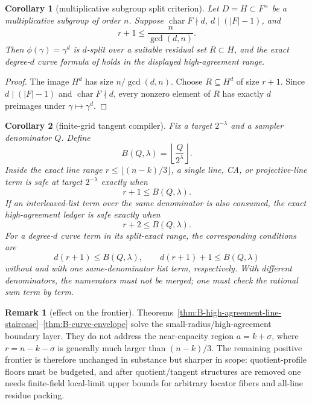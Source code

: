 \documentclass[11pt]{article}
\newtheorem{corollary}[corollary]{Corollary}
\theoremstyle{definition}
\newtheorem{remark}[remark]{Remark}
\begin{document}
\begin{corollary}[multiplicative subgroup split criterion]\label{cor:B-mult-split}
Let \(D=H\subset F^\times\) be a multiplicative subgroup of order \(n\).  Suppose
\(\operatorname{char}F\nmid d\), \(d\mid(|F|-1)\), and
\[
        r+1\le \frac{n}{\gcd(d,n)}.
\]
Then \(\phi(\gamma)=\gamma^d\) is \(d\)-split over a suitable residual set
\(R\subset H\), and the exact degree-\(d\) curve formula of
 holds in the displayed high-agreement range.
\end{corollary}

\begin{proof}
The image \(H^d\) has size \(n/\gcd(d,n)\).  Choose \(R\subseteq H^d\) of size
\(r+1\).  Since \(d\mid(|F|-1)\) and \(\operatorname{char}F\nmid d\), every
nonzero element of \(R\) has exactly \(d\) preimages under \(\gamma\mapsto
\gamma^d\).
\end{proof}

\begin{corollary}[finite-grid tangent compiler]\label{cor:B-tangent-compiler}
Fix a target \(2^{-\lambda}\) and a sampler denominator \(Q\).  Define
\[
        B(Q,\lambda)=\left\lfloor \frac{Q}{2^\lambda}\right\rfloor .
\]
Inside the exact line range \(r\le\lfloor(n-k)/3\rfloor\), a single line, CA, or
projective-line term is safe at target \(2^{-\lambda}\) exactly when
\[
        r+1\le B(Q,\lambda).
\]
If an interleaved-list term over the same denominator is also consumed, the
exact high-agreement ledger is safe exactly when
\[
        r+2\le B(Q,\lambda).
\]
For a degree-\(d\) curve term in its split-exact range, the corresponding
conditions are
\[
        d(r+1)\le B(Q,\lambda),
        \qquad
        d(r+1)+1\le B(Q,\lambda)
\]
without and with one same-denominator list term, respectively.  With different
denominators, the numerators must not be merged; one must check the rational
sum term by term.
\end{corollary}

\begin{remark}[effect on the frontier]
Theorems~\ref{thm:B-high-agreement-line-staircase}--\ref{thm:B-curve-envelope}
solve the small-radius/high-agreement boundary layer.  They do not address the
near-capacity region \(a=k+\sigma\), where \(r=n-k-\sigma\) is generally much
larger than \((n-k)/3\).  The remaining positive frontier is therefore unchanged
in substance but sharper in scope: quotient-profile floors must be budgeted, and
after quotient/tangent structures are removed one needs finite-field local-limit
upper bounds for arbitrary locator fibers and all-line residue packing.
\end{remark}
\end{document}
